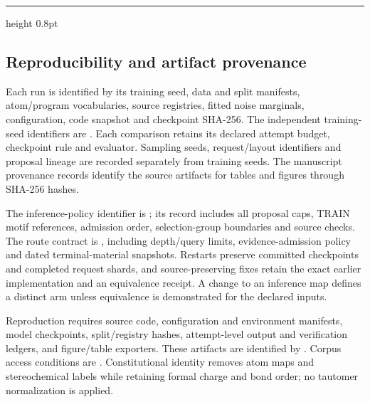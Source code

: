 \nopagebreak\hrule height 0.8pt
\endgroup

\subsection{Reproducibility and artifact provenance}
\label{app:repro}

Each run is identified by its training seed, data and split manifests, atom/program vocabularies,
source registries, fitted noise marginals, configuration, code snapshot and checkpoint SHA-256.
The independent training-seed identifiers are . Each
comparison retains its declared attempt budget, checkpoint rule and evaluator. Sampling seeds,
request/layout identifiers and proposal lineage are recorded separately from training seeds.
The manuscript provenance records identify the source artifacts for tables and figures through
SHA-256 hashes.

The inference-policy identifier is ; its record includes
all proposal caps, TRAIN motif references, admission order, selection-group boundaries and source
checks. The route contract is , including depth/query
limits, evidence-admission policy and dated terminal-material snapshots. Restarts preserve committed
checkpoints and completed request shards, and source-preserving fixes retain the exact earlier
implementation and an equivalence receipt. A change to an inference map defines a distinct arm
unless equivalence is demonstrated for the declared inputs.

Reproduction requires source code, configuration and environment manifests, model checkpoints,
split/registry hashes, attempt-level output and verification ledgers, and figure/table exporters.
These artifacts are identified by . Corpus access conditions are
. Constitutional identity removes atom maps and stereochemical
labels while retaining formal charge and bond order; no tautomer normalization is applied.

\clearpage

